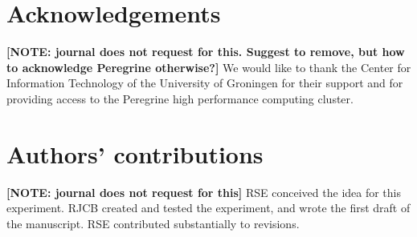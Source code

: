 \documentclass{article}
\begin{document}
\section{Acknowledgements}

\textbf{[NOTE: journal does not request for this. Suggest to remove, but how to acknowledge Peregrine otherwise?]}
We would like to thank the Center for Information Technology of the University of Groningen for their support
and for providing access to the Peregrine high performance computing cluster.

\section{Authors' contributions}

\textbf{[NOTE: journal does not request for this]}
RSE conceived the idea for this experiment. 
RJCB created and tested the experiment, 
and wrote the first draft of the manuscript. 
RSE contributed substantially to revisions.




\appendix
\end{document}
